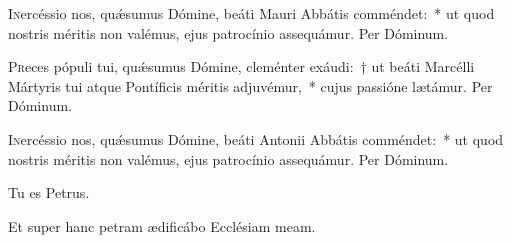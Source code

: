 \documentclass[vesperale_romanum.tex]{subfiles}
\begin{document}
\oratio

\lettrine{I}{n}ercéssio nos, quǽsumus Dómine, beáti Mauri Abbátis comméndet:~* ut quod nostris méritis non valémus, ejus patrocínio assequámur.
Per Dóminum.

\commsequentis

\myrule

\newpage


\semiduplex


\oratio

\lettrine{P}{r}eces pópuli tui, quǽsumus Dómine, cleménter exáudi:~† ut beáti Marcélli Mártyris tui atque Pontíficis méritis adjuvémur,~* cujus passióne lætámur.
Per Dóminum.

\vespsequentiscomm

\myrule


\duplex

\oratio

\lettrine{I}{n}ercéssio nos, quǽsumus Dómine, beáti Antonii Abbátis comméndet:~* ut quod nostris méritis non valémus, ejus patrocínio assequámur.
Per Dóminum.



\myrule
\label{jan_18}
{}


\duplexmajus




\label{vv_tu_es_petrus}
 \vv Tu es Petrus.

\rr Et super hanc petram ædificábo Ecclésiam meam.
\end{document}
